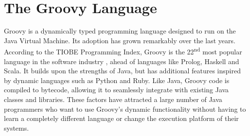\documentclass[preprint]{sigplanconf}
\begin{document}









%
%

\section{The Groovy Language\label{groovy}}
Groovy is a dynamically typed programming language designed to run on the Java Virtual Machine.
Its adoption has grown remarkably over the last years.
According to the TIOBE Programming Index, Groovy is the 22\textsuperscript{nd} most popular language in the software industry \cite{tiobe}, ahead of languages like Prolog, Haskell and Scala. 
It builds upon the strengths of Java, but has additional features inspired by dynamic languages such as Python and Ruby.
Like Java, Groovy code is compiled to bytecode, allowing it to seamlessly integrate with existing Java classes and libraries. 
These factors have attracted a large number of Java programmers who want to use Groovy's dynamic functionality without having to learn a completely different language or change the execution platform of their systems. 

\end{document}
